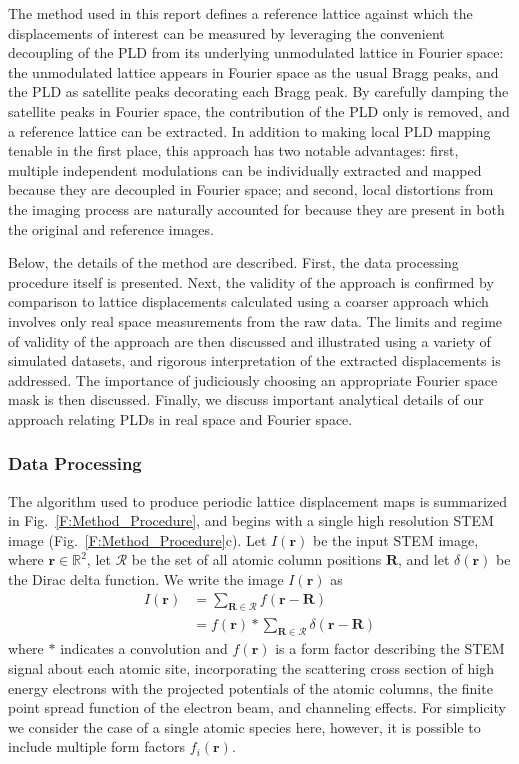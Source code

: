 \documentclass[12pt]{article}
\begin{document}
The method used in this report defines a reference lattice against which the displacements of interest can be measured by leveraging the convenient decoupling of the PLD from its underlying unmodulated lattice in Fourier space: the unmodulated lattice appears in Fourier space as the usual Bragg peaks, and the PLD as satellite peaks decorating each Bragg peak.
By carefully damping the satellite peaks in Fourier space, the contribution of the PLD only is removed, and a reference lattice can be extracted.
In addition to making local PLD mapping tenable in the first place, this approach has two notable advantages:
first, multiple independent modulations can be individually extracted and mapped because they are decoupled in Fourier space; and second, local distortions from the imaging process are naturally accounted for because they are present in both the original and reference images.

Below, the details of the method are described.
First, the data processing procedure itself is presented.  
Next, the validity of the approach is confirmed by comparison to lattice displacements calculated using a coarser approach which involves only real space measurements from the raw data.  
The limits and regime of validity of the approach are then discussed and illustrated using a variety of simulated datasets, and rigorous interpretation of the extracted displacements is addressed.  
The importance of judiciously choosing an appropriate Fourier space mask is then discussed.  
Finally, we discuss important analytical details of our approach relating PLDs in real space and Fourier space.

\subsubsection*{Data Processing}




The algorithm used to produce periodic lattice displacement maps is summarized in Fig.~\ref{F:Method_Procedure}, and begins with a single high resolution STEM image (Fig.~\ref{F:Method_Procedure}c).
Let $I(\mathbf{r})$ be the input STEM image, where $\mathbf{r}\in\mathbb{R}^2$, let $\mathcal{R}$ be the set of all atomic column positions $\mathbf{R}$, and let $\delta(\mathbf{r})$ be the Dirac delta function.  We write the image $I(\mathbf{r})$ as
\begin{align}\label{E:image}
    I(\mathbf{r}) &= \sum_{\mathbf{R}\in\mathcal{R}} f\left(\mathbf{r}-\mathbf{R}\right) \nonumber\\
                  &= f\left(\mathbf{r}\right) \ast \sum_{\mathbf{R}\in\mathcal{R}} \delta\left(\mathbf{r} - \mathbf{R}\right)
\end{align}
where $\ast$ indicates a convolution and $f(\mathbf{r})$ is a form factor describing the STEM signal about each atomic site, incorporating the scattering cross section of high energy electrons with the projected potentials of the atomic columns, the finite point spread function of the electron beam, and channeling effects. 
For simplicity we consider the case of a single atomic species here, however, it is possible to include multiple form factors $f_i(\mathbf{r})$.
\end{document}
